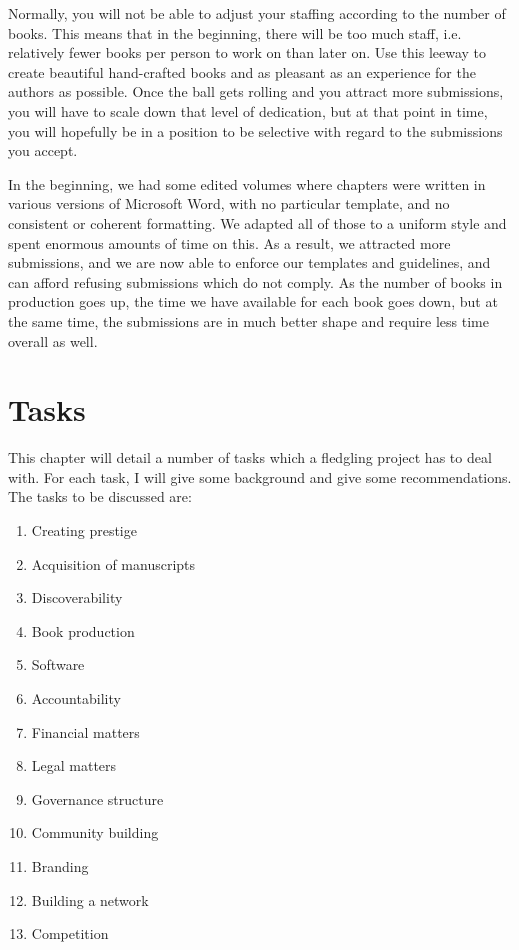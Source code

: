 \documentclass[guidelines,nonflat,modfonts] {langsci/langscibook}
\begin{document}
Normally, you will not be able to adjust your staffing according to the number of books. This means that in the beginning, there will be too much staff, i.e. relatively fewer books per person to work on than later on. Use this leeway to create beautiful hand-crafted books and as pleasant as an experience for the authors as possible. Once the ball gets rolling and you attract more submissions, you will have to scale down that level of dedication, but at that point in time, you will hopefully be in a position to be selective with regard to the submissions you accept. 

In the beginning, we had some edited volumes where chapters were written in various versions of Microsoft Word, with no particular template, and no consistent or coherent formatting. We adapted all of those to a uniform style and spent enormous amounts of time on this. As a result, we attracted more submissions, and we are now able to enforce our templates and guidelines, and can afford refusing submissions which do not comply. As the number of books in production goes up, the time we have available for each book goes down, but at the same time, the submissions are in much better shape and require less time overall as well. 

\chapter{Tasks}
This chapter will detail a number of tasks which a fledgling project has to deal with. For each task, I will give some background and give some recommendations. The tasks to be discussed are:

\begin{enumerate}
 \item Creating prestige 
 \item Acquisition of manuscripts
 \item Discoverability
 \item Book production
 \item Software
 \item Accountability
 \item Financial matters
 \item Legal matters
 \item Governance structure
 \item Community building
 \item Branding
 \item Building a network
 \item Competition
\end{enumerate}
\end{document}
